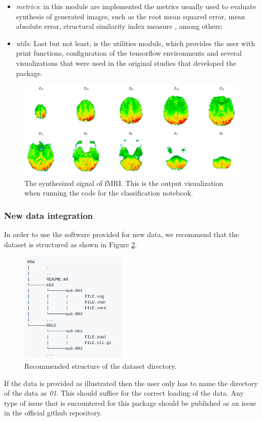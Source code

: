 \begin{itemize}
    \item \textit{metrics}: in this module are implemented the metrics usually used to evaluate synthesis of generated images, such as the root mean squared error, mean absolute error, structural similarity index measure \cite{wang2004image}, among others; 
    \item \textit{utils}: Last but not least, is the utilities module, which provides the user with print functions, configuration of the tensorflow environments and several visualizations that were used in the original studies that developed the package.
\end{itemize}

\begin{figure}[t]
    \centering
    \includegraphics[width=\textwidth]{figures/sythesized.png}
    \caption{The synthesized signal of fMRI. This is the output visualization when running the code for the classification notebook.}
    \label{fig:synthesized}
\end{figure}

\subsubsection{New data integration}\label{section:new_data}

In order to use the software provided for new data, we recommend that the dataset is structured as shown in Figure \ref{fig:structure}.
\begin{figure}[ht]
    \centering
    \includegraphics[width=0.45\textwidth]{figures/structure.png}
    \caption{Recommended structure of the dataset directory.}
    \label{fig:structure}
\end{figure}
If the data is provided as illustrated then the user only has to name the directory of the data as \textit{01}. This should suffice for the correct loading of the data. Any type of issue that is encountered for this package should be published as an issue in the official github repository.

